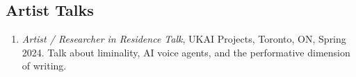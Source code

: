     \subsection{Artist Talks}
    \begin{enumerate}
    \item \emph{Artist / Researcher in Residence Talk}, UKAI Projects, Toronto, ON, Spring 2024. \subitem Talk about liminality, AI voice agents, and the performative dimension of writing. 
    \end{enumerate}
 
